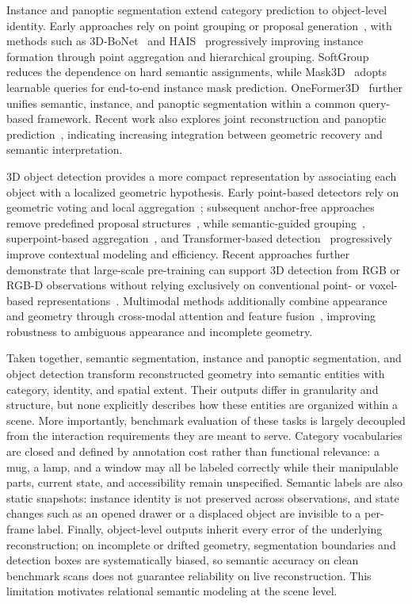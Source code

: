 \documentclass{SCIS2026}
\begin{document}
Instance and panoptic segmentation extend category prediction to object-level identity. Early approaches rely on point grouping or proposal generation~\cite{jiang2020pointgroup}, with methods such as 3D-BoNet~\cite{yang2019learning} and HAIS~\cite{chen2021hais} progressively improving instance formation through point aggregation and hierarchical grouping. SoftGroup~\cite{vu2022softgroup} reduces the dependence on hard semantic assignments, while Mask3D~\cite{schult2023mask3d} adopts learnable queries for end-to-end instance mask prediction. OneFormer3D~\cite{kolodiazhnyi2024oneformer3d} further unifies semantic, instance, and panoptic segmentation within a common query-based framework. Recent work also explores joint reconstruction and panoptic prediction~\cite{barberteguy2026pano3d}, indicating increasing integration between geometric recovery and semantic interpretation.

3D object detection provides a more compact representation by associating each object with a localized geometric hypothesis. Early point-based detectors rely on geometric voting and local aggregation~\cite{qi2019deep}; subsequent anchor-free approaches remove predefined proposal structures~\cite{rukhovich2022fcaf3d}, while semantic-guided grouping~\cite{wang2022cagroup3d}, superpoint-based aggregation~\cite{zhu2024spgroup3d}, and Transformer-based detection~\cite{rukhovich2023tr3d} progressively improve contextual modeling and efficiency. Recent approaches further demonstrate that large-scale pre-training can support 3D detection from RGB or RGB-D observations without relying exclusively on conventional point- or voxel-based representations~\cite{lazarow2025cubify}. Multimodal methods additionally combine appearance and geometry through cross-modal attention and feature fusion~\cite{cheng2023tbfnt3d}, improving robustness to ambiguous appearance and incomplete geometry.

Taken together, semantic segmentation, instance and panoptic segmentation, and object detection transform reconstructed geometry into semantic entities with category, identity, and spatial extent. Their outputs differ in granularity and structure, but none explicitly describes how these entities are organized within a scene. More importantly, benchmark evaluation of these tasks is largely decoupled from the interaction requirements they are meant to serve. Category vocabularies are closed and defined by annotation cost rather than functional relevance: a mug, a lamp, and a window may all be labeled correctly while their manipulable parts, current state, and accessibility remain unspecified. Semantic labels are also static snapshots: instance identity is not preserved across observations, and state changes such as an opened drawer or a displaced object are invisible to a per-frame label. Finally, object-level outputs inherit every error of the underlying reconstruction; on incomplete or drifted geometry, segmentation boundaries and detection boxes are systematically biased, so semantic accuracy on clean benchmark scans does not guarantee reliability on live reconstruction. This limitation motivates relational semantic modeling at the scene level.
\end{document}
